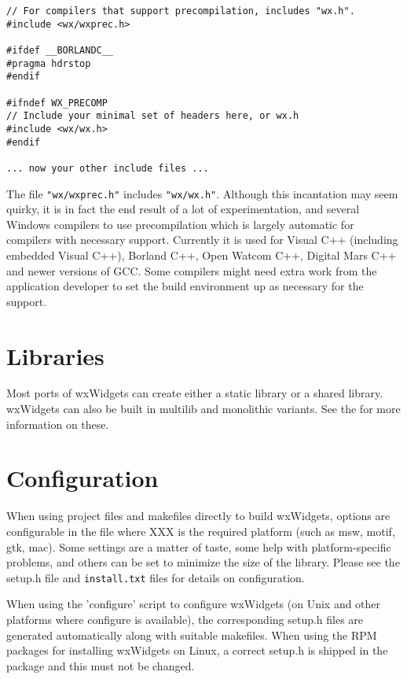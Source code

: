 \begin{verbatim}
// For compilers that support precompilation, includes "wx.h".
#include <wx/wxprec.h>

#ifdef __BORLANDC__
#pragma hdrstop
#endif

#ifndef WX_PRECOMP
// Include your minimal set of headers here, or wx.h
#include <wx/wx.h>
#endif

... now your other include files ...
\end{verbatim}

The file {\tt "wx/wxprec.h"} includes {\tt "wx/wx.h"}. Although this incantation
may seem quirky, it is in fact the end result of a lot of experimentation,
and several Windows compilers to use precompilation which is largely automatic for
compilers with necessary support. Currently it is used for Visual C++ (including
embedded Visual C++), Borland C++, Open Watcom C++, Digital Mars C++
and newer versions of GCC.
Some compilers might need extra work from the application developer to set the
build environment up as necessary for the support.

\section{Libraries}\label{libraries}

Most ports of wxWidgets can create either a static library or a shared
library. wxWidgets can also be built in multilib and monolithic variants.
See the  for more
information on these.

\section{Configuration}\label{configuration}

When using project files and makefiles directly to build wxWidgets,
options are configurable in the file
 where XXX is the required platform (such as msw, motif, gtk, mac). Some 
settings are a matter of taste, some help with platform-specific problems, and
others can be set to minimize the size of the library. Please see the setup.h file
and {\tt install.txt} files for details on configuration.

When using the 'configure' script to configure wxWidgets (on Unix and other platforms where
configure is available), the corresponding setup.h files are generated automatically
along with suitable makefiles. When using the RPM packages
for installing wxWidgets on Linux, a correct setup.h is shipped in the package and
this must not be changed.

